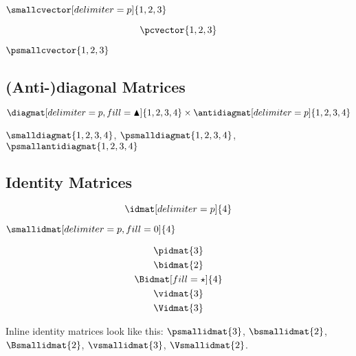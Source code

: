 \documentclass[parskip=half]{scrartcl}
\begin{document}
\fulllinerule

\begin{SideBySideExample}[xrightmargin=.45\textwidth]
\(\smallcvector[delimiter=p]{1,2,3}\)
\end{SideBySideExample}

\fulllinerule

\begin{SideBySideExample}[gobble=2,xrightmargin=.5\textwidth]
  \[
    \pcvector{1,2,3}
  \]

  \(\psmallcvector{1,2,3}\)
\end{SideBySideExample}

\fulllinerule

\subsection{(Anti-)diagonal Matrices}
\begin{Example}[gobble=2]
  \[
    \diagmat[delimiter=p,fill=\blacktriangle]{1,2,3,4} \times
    \antidiagmat[delimiter=p]{1,2,3,4}
  \]
\end{Example}

\fulllinerule

\begin{Example}[gobble=2]
  \(\smalldiagmat{1,2,3,4}\),
  \(\psmalldiagmat{1,2,3,4}\),
  \(\psmallantidiagmat{1,2,3,4}\)
\end{Example}

\nopagebreak\fulllinerule

\subsection{Identity Matrices}
\begin{SideBySideExample}[xrightmargin=.45\textwidth,gobble=2]
  \[
    \idmat[delimiter=p]{4}
  \]

  \(\smallidmat[delimiter=p,fill=0]{4}\)
\end{SideBySideExample}

\fulllinerule

\begin{SideBySideExample}[xrightmargin=.45\textwidth,gobble=2]
  \begin{gather*}
    \pidmat{3}\\
    \bidmat{2}\\
    \Bidmat[fill=\star]{4}\\
    \vidmat{3}\\
    \Vidmat{3}
  \end{gather*}
\end{SideBySideExample}

\nopagebreak\fulllinerule

\begin{Example}[gobble=2]
  Inline identity matrices look like this:
  \(\psmallidmat{3}\), \(\bsmallidmat{2}\), \(\Bsmallidmat{2}\),
  \(\vsmallidmat{3}\), \(\Vsmallidmat{2}\).
\end{Example}
\end{document}
